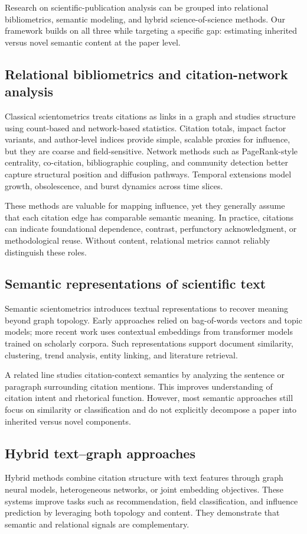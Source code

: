 Research on scientific-publication analysis can be grouped into relational bibliometrics, semantic modeling, and hybrid science-of-science methods. Our framework builds on all three while targeting a specific gap: estimating inherited versus novel semantic content at the paper level.

\subsection{Relational bibliometrics and citation-network analysis}
Classical scientometrics treats citations as links in a graph and studies structure using count-based and network-based statistics. Citation totals, impact factor variants, and author-level indices provide simple, scalable proxies for influence, but they are coarse and field-sensitive. Network methods such as PageRank-style centrality, co-citation, bibliographic coupling, and community detection better capture structural position and diffusion pathways. Temporal extensions model growth, obsolescence, and burst dynamics across time slices.

These methods are valuable for mapping influence, yet they generally assume that each citation edge has comparable semantic meaning. In practice, citations can indicate foundational dependence, contrast, perfunctory acknowledgment, or methodological reuse. Without content, relational metrics cannot reliably distinguish these roles.

\subsection{Semantic representations of scientific text}
Semantic scientometrics introduces textual representations to recover meaning beyond graph topology. Early approaches relied on bag-of-words vectors and topic models; more recent work uses contextual embeddings from transformer models trained on scholarly corpora. Such representations support document similarity, clustering, trend analysis, entity linking, and literature retrieval.

A related line studies citation-context semantics by analyzing the sentence or paragraph surrounding citation mentions. This improves understanding of citation intent and rhetorical function. However, most semantic approaches still focus on similarity or classification and do not explicitly decompose a paper into inherited versus novel components.

\subsection{Hybrid text--graph approaches}
Hybrid methods combine citation structure with text features through graph neural models, heterogeneous networks, or joint embedding objectives. These systems improve tasks such as recommendation, field classification, and influence prediction by leveraging both topology and content. They demonstrate that semantic and relational signals are complementary.

